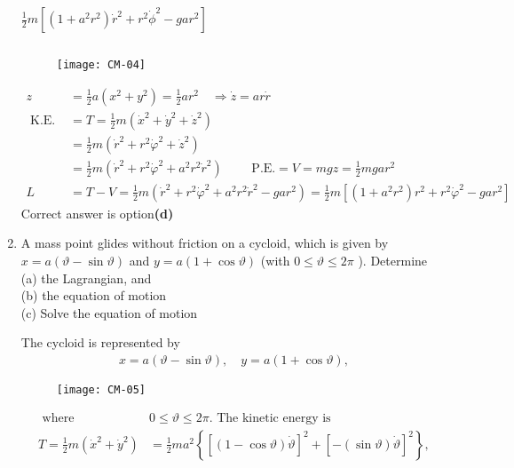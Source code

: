 \begin{enumerate}
\begin{tasks}
		\task[\textbf{d.}]  $\frac{1}{2} m\left[\left(1+a^{2} r^{2}\right) \dot{r}^{2}+r^{2} \dot{\phi}^{2}-g a r^{2}\right]$
	\end{tasks}
	\begin{answer}$\left. \right. $
		\begin{figure}[H]
			\centering
			\texttt{[image: CM-04]}
		\end{figure}
		\begin{align*}
		z&=\frac{1}{2} a\left(x^{2}+y^{2}\right)=\frac{1}{2} a r^{2} \quad \Rightarrow \dot{z}=a r \dot{r}\\
	\text{	K.E. }&=T=\frac{1}{2} m\left(\dot{x}^{2}+\dot{y}^{2}+\dot{z}^{2}\right)\\
	&=\frac{1}{2} m\left(\dot{r}^{2}+r^{2} \dot{\varphi}^{2}+\dot{z}^{2}\right)\\
	&=\frac{1}{2} m\left(\dot{r}^{2}+r^{2} \dot{\varphi}^{2}+a^{2} r^{2} \dot{r}^{2}\right) \qquad\text{ P.E.} =V=m g z=\frac{1}{2} m g a r^{2}\\
	L&=T-V=\frac{1}{2} m\left(\dot{r}^{2}+r^{2} \dot{\varphi}^{2}+a^{2} r^{2} \dot{r}^{2}-g a r^{2}\right)=\frac{1}{2} m\left[\left(1+a^{2} r^{2}\right) r^{2}+r^{2} \dot{\varphi}^{2}-g a r^{2}\right]
		\end{align*}
		Correct answer is option\textbf{(d)}
	\end{answer}
	\item A mass point glides without friction on a cycloid, which is given by $x=a(\vartheta-\sin \vartheta)$ and $y=a(1+\cos \vartheta)$ (with $0 \leq \vartheta \leq 2 \pi$ ). Determine\\
	(a) the Lagrangian, and\\
	(b) the equation of motion\\
	(c) Solve the equation of motion
	\begin{answer}
		The cycloid is represented by
		\begin{align*}
		x=a(\vartheta-\sin \vartheta), \quad y=a(1+\cos \vartheta),
		\end{align*}
		\begin{figure}[H]
			\centering
			\texttt{[image: CM-05]}
		\end{figure}
		\begin{align*}
	\text{	where }&0 \leq \vartheta \leq 2 \pi.\text{ The kinetic energy is}\\
		T=\frac{1}{2} m\left(\dot{x}^{2}+\dot{y}^{2}\right)&=\frac{1}{2} m a^{2}\left\{[(1-\cos \vartheta) \dot{\vartheta}]^{2}+[-(\sin \vartheta) \dot{\vartheta}]^{2}\right\},\\

\end{align*}
\end{answer}
\end{enumerate}
